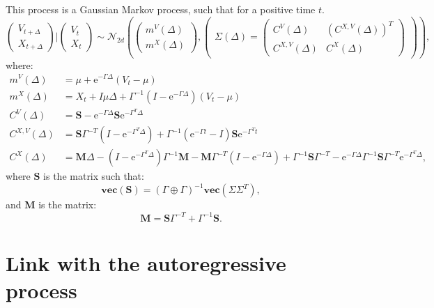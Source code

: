 \documentclass[
]{book}
\newcommand{\e}{\text{e}}
\newcommand{\inv}{^{-1}}
\newcommand{\GpG}{\left( \Gamma \oplus \Gamma \right)}
\newcommand{\Vect}[1]{\textbf{vec}\left(#1 \right)}
\newcommand{\Sinf}{\mathbf{S}}
\newcommand{\M}{\mathbf{M}}
\begin{document}
This process is a Gaussian Markov process, such that for a positive time \(t\).
\[\begin{pmatrix}
V_{t + \Delta}\\
X_{t + \Delta}
\end{pmatrix} \vert \begin{pmatrix}
V_{t} \\
X_{t}
\end{pmatrix} \sim \mathcal{N}_{2d}\left( \begin{pmatrix}
m^V(\Delta)\\
m^X(\Delta)
\end{pmatrix}, \begin{pmatrix}
\Sigma(\Delta) = \begin{pmatrix}
C^{V}(\Delta) & \left(C^{X, V}(\Delta)\right)^T\\
C^{X, V}(\Delta) & C^{X}(\Delta)
\end{pmatrix}
\end{pmatrix} \right), \]
where:
\begin{align*}
m^V(\Delta) &= \mu + \e^{-\Gamma \Delta} (V_t - \mu)\\
m^X(\Delta) &= X_t + I\mu \Delta + \Gamma\inv(I -  \e^{-\Gamma \Delta})(V_t - \mu)\\
 C^V(\Delta) &= \Sinf -\e^{-\Gamma \Delta}\Sinf \e^{-\Gamma^T \Delta}\\
 C^{X,V}(\Delta) &= \Sinf \Gamma^{-T}\left(I - \e^{-\Gamma^T \Delta}\right) + \Gamma\inv\left(\e^{-\Gamma t} - I\right)\Sinf  \e^{-\Gamma^T t}\\
 C^X(\Delta) &= \M \Delta - \left(I - \e^{-\Gamma^T \Delta}\right)\Gamma\inv \M - \M\Gamma^{-T}\left(I - \e^{-\Gamma \Delta}\right)+ \Gamma\inv \Sinf \Gamma^{-T} -
   \e^{-\Gamma \Delta}\Gamma\inv\Sinf\Gamma^{-T}\e^{-\Gamma^T \Delta},
\end{align*}
where \(\Sinf\) is the matrix such that:
\begin{equation*}
\Vect{\Sinf} = \GpG\inv\Vect{\Sigma \Sigma^T},
\end{equation*}
and \(\M\) is the matrix:
\begin{equation*}
\M= \Sinf\Gamma^{-T} + \Gamma\inv\Sinf.
\end{equation*}

\hypertarget{link-with-the-autoregressive-process}{%
\section{Link with the autoregressive process}\label{link-with-the-autoregressive-process}}
\end{document}
